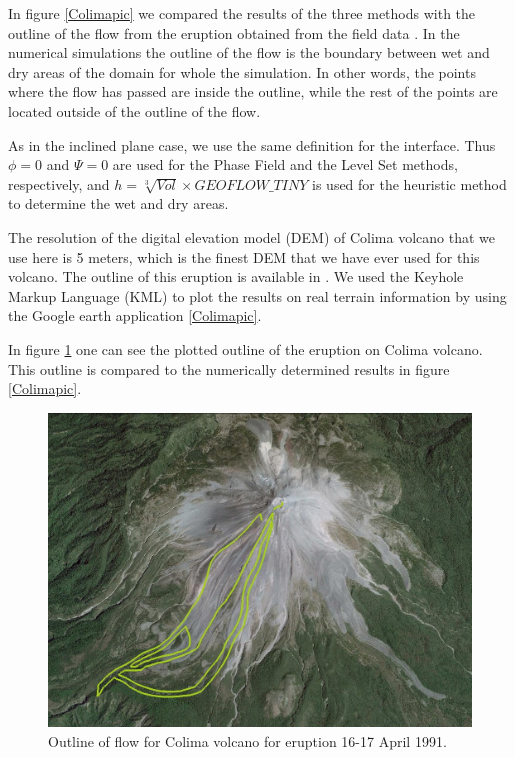 \documentclass[review]{elsarticle}
\begin{document}
In figure \ref{Colimapic} we compared the results of the three methods with the outline of the flow from the eruption obtained from the field data \cite{Rupp2006}. 
In the numerical simulations the outline of the flow is the boundary between wet and dry areas of the domain for whole the simulation. In other words, the points where the flow has
passed are inside the outline, while the rest of the points are located outside of the outline of the flow. 

As in the inclined plane case, we use the same definition for the interface.
Thus $\phi=0$ and $\varPsi=0$ are used for the Phase Field and the Level Set methods, respectively, and $h=\sqrt[3]{Vol} \times GEOFLOW\_TINY $ 
is used for the heuristic method to determine the wet and dry areas.
 
The resolution of the digital elevation model (DEM) of Colima volcano that we use here is 5 meters, which is the finest DEM 
that we have ever used for this volcano.
The outline of this eruption is available in \cite{NamikawaPhD}.
We used the Keyhole Markup Language (KML) to plot the results on real terrain information by using the Google earth application \ref{Colimapic}. 

In figure \ref{colima_outline} one can see the plotted outline of the eruption on Colima volcano. 
This outline is compared to the numerically determined results in figure \ref{Colimapic}.

\begin{figure}[H]
\centering
\includegraphics[width=.5\textwidth]{IMAGES/outline1.jpg}
\caption{Outline of flow for Colima volcano for eruption 16-17 April 1991.}
 \label{colima_outline}

\end{figure}
\end{document}
